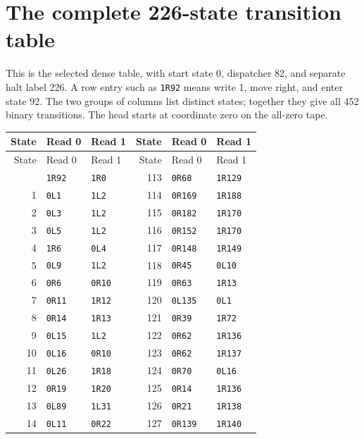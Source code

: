 \section{The complete 226-state transition table}
\label{app:table}
This is the selected dense table, with start state 0, dispatcher 82,
and separate halt label 226. A row entry such as \texttt{1R92}
means write 1, move right, and enter state 92. The two groups of
columns list distinct states; together they give all 452 binary
transitions. The head starts at coordinate zero on the all-zero tape.
\begin{longtable}{@{}rll@{\qquad\qquad}rll@{}}
\toprule State & Read 0 & Read 1 & State & Read 0 & Read 1\\\midrule
\endfirsthead
\toprule State & Read 0 & Read 1 & State & Read 0 & Read 1\\\midrule
\endhead
\bottomrule\endfoot
0 & \texttt{1R92} & \texttt{1R0} & 113 & \texttt{0R68} & \texttt{1R129}\\
1 & \texttt{0L1} & \texttt{1L2} & 114 & \texttt{0R169} & \texttt{1R188}\\
2 & \texttt{0L3} & \texttt{1L2} & 115 & \texttt{0R182} & \texttt{1R170}\\
3 & \texttt{0L5} & \texttt{1L2} & 116 & \texttt{0R152} & \texttt{1R170}\\
4 & \texttt{1R6} & \texttt{0L4} & 117 & \texttt{0R148} & \texttt{1R149}\\
5 & \texttt{0L9} & \texttt{1L2} & 118 & \texttt{0R45} & \texttt{0L10}\\
6 & \texttt{0R6} & \texttt{0R10} & 119 & \texttt{0R63} & \texttt{1R13}\\
7 & \texttt{0R11} & \texttt{1R12} & 120 & \texttt{0L135} & \texttt{0L1}\\
8 & \texttt{0R14} & \texttt{1R13} & 121 & \texttt{0R39} & \texttt{1R72}\\
9 & \texttt{0L15} & \texttt{1L2} & 122 & \texttt{0R62} & \texttt{1R136}\\
10 & \texttt{0L16} & \texttt{0R10} & 123 & \texttt{0R62} & \texttt{1R137}\\
11 & \texttt{0L26} & \texttt{1R18} & 124 & \texttt{0R70} & \texttt{0L16}\\
12 & \texttt{0R19} & \texttt{1R20} & 125 & \texttt{0R14} & \texttt{1R136}\\
13 & \texttt{0L89} & \texttt{1L31} & 126 & \texttt{0R21} & \texttt{1R138}\\
14 & \texttt{0L11} & \texttt{0R22} & 127 & \texttt{0R139} & \texttt{1R140}\\

\end{longtable}
